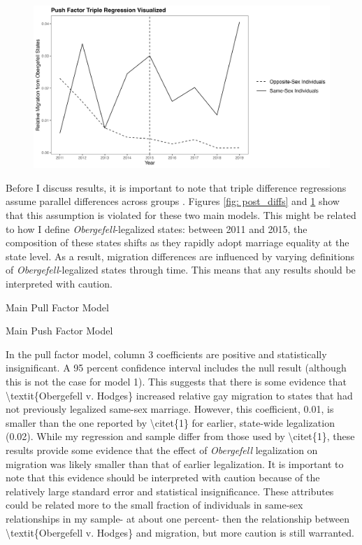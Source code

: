 \documentclass[12pt,letterpaper]{article}
\begin{document}
\begin{figure}[htbp]
    \centering
    \includegraphics[width=0.75\linewidth]{outputs/summary_stats/ante_diffs.png}
    \caption{}
    \label{fig: ante_diffs}
\end{figure}

Before I discuss results, it is important to note that triple difference regressions assume parallel differences across groups \citep{23, 24, 25}. Figures \ref{fig: post_diffs} and \ref{fig: ante_diffs} show that this assumption is violated for these two main models. This might be related to how I define \textit{Obergefell}-legalized states: between 2011 and 2015, the composition of these states shifts as they rapidly adopt marriage equality at the state level. As a result, migration differences are influenced by varying definitions of \textit{Obergefell}-legalized states through time. This means that any results should be interpreted with caution.

\begin{table}[htbp]
    \centering
    \caption{Main Pull Factor Model}
    \label{tab: expost_model}
    
\end{table}
\begin{table}[htbp]
    \centering
    \caption{Main Push Factor Model}
    \label{tab: exante_model}
    
\end{table}

In the pull factor model, column 3 coefficients are positive and statistically insignificant. A 95 percent confidence interval includes the null result (although this is not the case for model 1). This suggests that there is some evidence that \textbackslash{}textit\{Obergefell v. Hodges\} increased relative gay migration to states that had not previously legalized same-sex marriage. However, this coefficient, 0.01, is smaller than the one reported by \textbackslash{}citet\{1\} for earlier, state-wide legalization (0.02). While my regression and sample differ from those used by \textbackslash{}citet\{1\}, these results provide some evidence that the effect of \textit{Obergefell} legalization on migration was likely smaller than that of earlier legalization. It is important to note that this evidence should be interpreted with caution because of the relatively large standard error and statistical insignificance. These attributes could be related more to the small fraction of individuals in same-sex relationships in my sample- at about one percent- then the relationship between \textbackslash{}textit\{Obergefell v. Hodges\} and migration, but more caution is still warranted.
\end{document}
